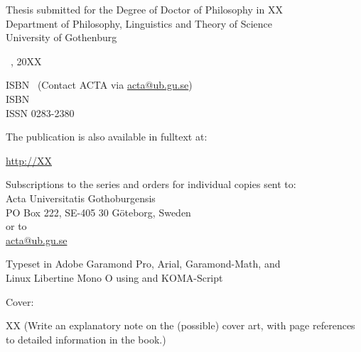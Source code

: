 \newpage
\restoregeometry
\frontmatterchapters

\fontsize{13}{18}\selectfont

\vspace*{\fill}

\begin{flushleft}
Thesis submitted for the Degree of Doctor of Philosophy in XX\\
Department of Philosophy, Linguistics and Theory of Science\\
University of Gothenburg
\end{flushleft}


\begin{flushleft}
\textcopyright\ 
\makeatletter{\MakeUppercase{\@author}}\makeatother, 20XX
\end{flushleft}

\begin{flushleft}
\makeatletter ISBN \makeatother\ (Contact ACTA via \url{acta@ub.gu.se})\\
\makeatletter ISBN \@isbnd { (pdf)}\makeatother\\
ISSN 0283-2380
\end{flushleft}

\begin{flushleft}
The publication is also available in fulltext at:

\url{http://XX}
\end{flushleft}

\begin{flushleft}
Subscriptions to the series and orders for individual copies sent to:\\
Acta Universitatis Gothoburgensis\\
PO Box 222, SE-405 30 G\"oteborg, Sweden \\
or to\\
\url{acta@ub.gu.se}
\end{flushleft}

\begin{flushleft}
Typeset in Adobe Garamond Pro, Arial, Garamond-Math, and\\
Linux Libertine Mono O using {\latexfont \XeLaTeX} and KOMA-Script
\end{flushleft}

\begin{flushleft}
Cover: 

XX (Write an explanatory note on the (possible) cover art, with page references to detailed information in the book.)
\end{flushleft}

